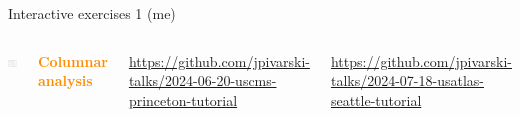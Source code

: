 \documentclass[aspectratio=169]{beamer}
\begin{document}
\begin{frame}{Interactive exercises 1 (me)}
\vspace{0.25 cm}
\large
\begin{columns}
\includegraphics[width=\linewidth]{PLOTS/teacher-student-notebook-pair.png}

\textcolor{darkorange}{\bf Columnar analysis}

\tiny
\vspace{0.2 cm}
\textcolor{blue}{\href{https://github.com/jpivarski-talks/2024-06-20-uscms-princeton-tutorial}{https://github.com/jpivarski-talks/2024-06-20-uscms-princeton-tutorial}}

\textcolor{blue}{\href{https://github.com/jpivarski-talks/2024-07-18-usatlas-seattle-tutorial}{https://github.com/jpivarski-talks/2024-07-18-usatlas-seattle-tutorial}}

\small
\vspace{0.2 cm}

\vspace{0.2 cm}

\vspace{0.2 cm}

\vspace{0.2 cm}
\end{columns}
\end{frame}
\end{document}
